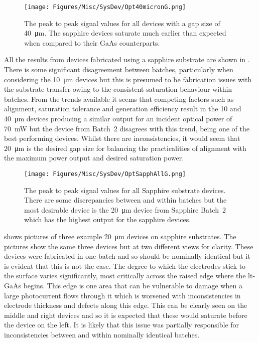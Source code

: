 \begin{figure}[h!]
    \centering
    \texttt{[image: Figures/Misc/SysDev/Opt40micronG.png]}
    \captionsetup{font = footnotesize, justification = centering}
    \caption[The Peak to Peak Signal Values for all Devices with \SI{40}{\micro\metre} Gap]{The peak to peak signal values for all devices with a gap size of \SI{40}{\micro\metre}. The sapphire devices saturate much earlier than expected when compared to their GaAs counterparts.}
    \label{fig:s40micron}
\end{figure}

All the results from devices fabricated using a sapphire substrate are shown in . There is some significant disagreement between batches, particularly when considering the \SI{10}{\micro\metre} devices but this is presumed to be fabrication issues with the substrate transfer owing to the consistent saturation behaviour within batches. From the trends available it seems that competing factors such as alignment, saturation tolerance and generation efficiency result in the 10 and \SI{40}{\micro\metre} devices producing a similar output for an incident optical power of \SI{70}{\milli\watt} but the device from Batch~2 disagrees with this trend, being one of the best performing devices. Whilst there are inconsistencies, it would seem that \SI{20}{\micro\metre} is the desired gap size for balancing the practicalities of alignment with the maximum power output and desired saturation power.

\begin{figure}[h!]
    \centering
    \texttt{[image: Figures/Misc/SysDev/OptSapphAllG.png]}
    \captionsetup{font = footnotesize, justification = centering}
    \caption[The Peak to Peak Signal Values for all Sapphire Substrate Devices]{The peak to peak signal values for all Sapphire substrate devices. There are some discrepancies between and within batches but the most desirable device is the \SI{20}{\micro\metre} device from Sapphire Batch~2 which has the highest output for the sapphire devices.}
    \label{fig:allsapph}
\end{figure}

 shows pictures of three example \SI{20}{\micro\metre} devices on sapphire substrates. The pictures show the same three devices but at two different views for clarity. These devices were fabricated in one batch and so should be nominally identical but it is evident that this is not the case. The degree to which the electrodes stick to the surface varies significantly, most critically across the raised edge where the \acrshort{lt}\nobreakdash-GaAs begins. This edge is one area that can be vulnerable to damage when a large photocurrent flows through it which is worsened with inconsistencies in electrode thickness and defects along this edge. This can be clearly seen on the middle and right devices and so it is expected that these would saturate before the device on the left. It is likely that this issue was partially responsible for inconsistencies between and within nominally identical batches.

